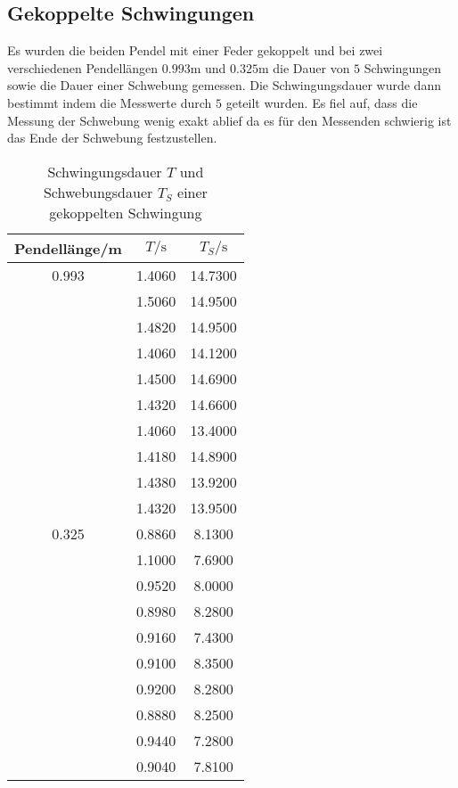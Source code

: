   \subsection{Gekoppelte Schwingungen}
    Es wurden die beiden Pendel mit einer Feder gekoppelt und bei zwei verschiedenen Pendellängen $0.993$m und $0.325$m die Dauer
    von $5$ Schwingungen sowie die Dauer einer Schwebung gemessen. Die Schwingungsdauer wurde dann bestimmt indem die Messwerte
    durch $5$ geteilt wurden. Es fiel auf, dass die Messung der Schwebung wenig exakt ablief da es für den Messenden schwierig
    ist das Ende der Schwebung festzustellen.
    \begin{table}
      \centering
        \caption{Schwingungsdauer $T$ und Schwebungsdauer $T_{S}$ einer gekoppelten Schwingung}
        \label{tab:aufgabe4}
        \begin{tabular}{S S S}
          \toprule
          {Pendellänge/m} & {$T/\si{\second}$} & {$T_{S}/\si{\second}$} \\
             &   1.4060 &     14.7300 \\
                  &   1.5060 &     14.9500 \\
                  &   1.4820 &     14.9500 \\
                  &   1.4060 &     14.1200 \\
                  &   1.4500 &     14.6900 \\
                  &   1.4320 &     14.6600 \\
                  &   1.4060 &     13.4000 \\
                  &   1.4180 &     14.8900 \\
                  &   1.4380 &     13.9200 \\
                  &   1.4320 &     13.9500 \\
          0.325   &   0.8860 &     8.1300 \\
                  &   1.1000 &     7.6900 \\
                  &   0.9520 &     8.0000 \\
                  &   0.8980 &     8.2800 \\
                  &   0.9160 &     7.4300 \\
                  &   0.9100 &     8.3500 \\
                  &   0.9200 &     8.2800 \\
                  &   0.8880 &     8.2500 \\
                  &   0.9440 &     7.2800 \\
                  &   0.9040 &     7.8100 \\
          \bottomrule
        \end{tabular}
      \end{table}
    \newpage

